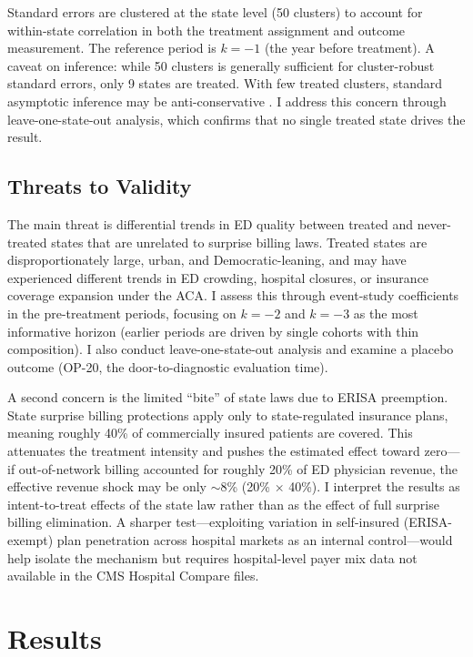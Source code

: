 \documentclass[12pt]{article}
\begin{document}
Standard errors are clustered at the state level (50 clusters) to account for within-state correlation in both the treatment assignment and outcome measurement. The reference period is $k = -1$ (the year before treatment). A caveat on inference: while 50 clusters is generally sufficient for cluster-robust standard errors, only 9 states are treated. With few treated clusters, standard asymptotic inference may be anti-conservative \citep{rambachan2023}. I address this concern through leave-one-state-out analysis, which confirms that no single treated state drives the result.

\subsection{Threats to Validity}

The main threat is differential trends in ED quality between treated and never-treated states that are unrelated to surprise billing laws. Treated states are disproportionately large, urban, and Democratic-leaning, and may have experienced different trends in ED crowding, hospital closures, or insurance coverage expansion under the ACA. I assess this through event-study coefficients in the pre-treatment periods, focusing on $k = -2$ and $k = -3$ as the most informative horizon (earlier periods are driven by single cohorts with thin composition). I also conduct leave-one-state-out analysis and examine a placebo outcome (OP-20, the door-to-diagnostic evaluation time).

A second concern is the limited ``bite'' of state laws due to ERISA preemption. State surprise billing protections apply only to state-regulated insurance plans, meaning roughly 40\% of commercially insured patients are covered. This attenuates the treatment intensity and pushes the estimated effect toward zero---if out-of-network billing accounted for roughly 20\% of ED physician revenue, the effective revenue shock may be only $\sim$8\% (20\% $\times$ 40\%). I interpret the results as intent-to-treat effects of the state law rather than as the effect of full surprise billing elimination. A sharper test---exploiting variation in self-insured (ERISA-exempt) plan penetration across hospital markets as an internal control---would help isolate the mechanism but requires hospital-level payer mix data not available in the CMS Hospital Compare files.


\section{Results}
\label{sec:results}
\end{document}
